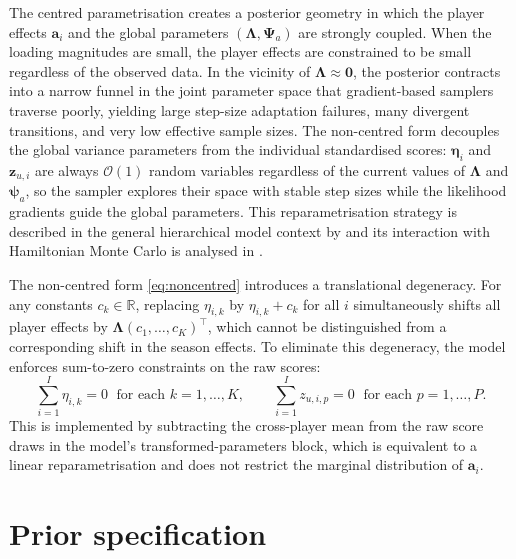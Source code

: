 \begin{remark}
\label{rem:funnel}
The centred parametrisation creates a posterior geometry in which the player effects $\mathbf{a}_i$ and the global parameters $(\boldsymbol{\Lambda}, \boldsymbol{\Psi}_a)$ are strongly coupled. When the loading magnitudes are small, the player effects are constrained to be small regardless of the observed data. In the vicinity of $\boldsymbol{\Lambda} \approx \mathbf{0}$, the posterior contracts into a narrow funnel in the joint parameter space that gradient-based samplers traverse poorly, yielding large step-size adaptation failures, many divergent transitions, and very low effective sample sizes. The non-centred form decouples the global variance parameters from the individual standardised scores: $\boldsymbol{\eta}_i$ and $\mathbf{z}_{u,i}$ are always $\mathcal{O}(1)$ random variables regardless of the current values of $\boldsymbol{\Lambda}$ and $\boldsymbol{\psi}_a$, so the sampler explores their space with stable step sizes while the likelihood gradients guide the global parameters. This reparametrisation strategy is described in the general hierarchical model context by \cite{papaspiliopoulos2007general} and its interaction with Hamiltonian Monte Carlo is analysed in \cite{neal2011mcmc}.
\end{remark}

\begin{remark}
\label{rem:sumtozero}
The non-centred form \eqref{eq:noncentred} introduces a translational degeneracy. For any constants $c_k \in \mathbb{R}$, replacing $\eta_{i,k}$ by $\eta_{i,k} + c_k$ for all $i$ simultaneously shifts all player effects by $\boldsymbol{\Lambda}(c_1, \ldots, c_K)^\top$, which cannot be distinguished from a corresponding shift in the season effects. To eliminate this degeneracy, the model enforces sum-to-zero constraints on the raw scores:
\begin{equation}
\sum_{i=1}^{I} \eta_{i,k} = 0 \;\text{ for each } k = 1, \ldots, K, \qquad
\sum_{i=1}^{I} z_{u,i,p} = 0 \;\text{ for each } p = 1, \ldots, P.
\label{eq:sumtozero}
\end{equation}
This is implemented by subtracting the cross-player mean from the raw score draws in the model's transformed-parameters block, which is equivalent to a linear reparametrisation and does not restrict the marginal distribution of $\mathbf{a}_i$.
\end{remark}

\section{Prior specification}
\label{sec:priors}

